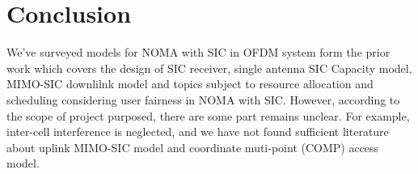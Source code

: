 \section{Conclusion}
\label{sec_conclusion}
We've surveyed models for NOMA with SIC in OFDM system form the
prior work which covers the design of SIC receiver, single antenna 
SIC Capacity model, MIMO-SIC downlilnk model and topics subject to
resource allocation and scheduling considering user fairness in NOMA with SIC.
However, according to the scope of project purposed, there are
some part remains unclear. For example, inter-cell interference
is neglected, and we have not found sufficient literature about
uplink MIMO-SIC model and coordinate muti-point (COMP) access
model. 

